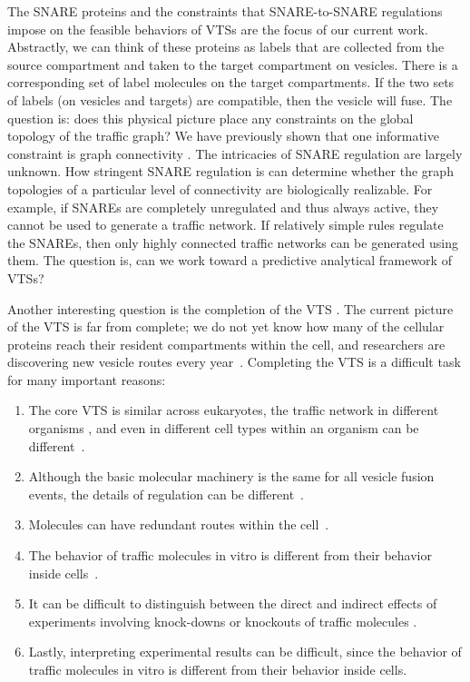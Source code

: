 The SNARE proteins and the constraints that SNARE-to-SNARE regulations
impose on the feasible behaviors of VTSs are the focus of
our current work.
%
Abstractly, we can think of these proteins as labels that are
collected from the source compartment and taken to the target
compartment on vesicles.
%
There is a corresponding set of label molecules on the target compartments.
%
If the two sets of labels (on vesicles and targets) are compatible,
then the vesicle will fuse.
%
The question is: does this physical picture place any constraints on
the global topology of the traffic graph? We have previously shown that one informative constraint is graph connectivity \cite{shukla2017discovering}.
%
The intricacies of SNARE regulation are largely unknown.
%
How stringent SNARE regulation is can determine whether the graph
topologies of a particular level of connectivity are biologically
realizable.
%
For example, if SNAREs are completely unregulated and thus always
active, they cannot be used to generate a traffic network.
%
If relatively simple rules regulate the SNAREs, then only
highly connected traffic networks can be generated using them.
%
The question is, can we work toward a predictive analytical framework
of VTSs?

Another interesting question is the completion of the VTS \cite{synthesisGupta}. 
%
The current picture of the VTS is far from complete; we do not yet know how many of the cellular proteins reach their resident compartments within the cell, and
researchers are discovering new vesicle routes every
year~\cite{nickel2018unconventional,weill2018toolbox}. 
%
Completing the VTS is a difficult task for many important reasons: 
\begin{enumerate}
	\item The core VTS is similar across eukaryotes, the traffic network in different organisms \cite{richardson2015evolutionary, barlow2017seeing}, and even in different cell types within an organism can be different~\cite{stoops2014trafficking,zhou2015arp2}.
	\item Although the basic molecular machinery is the same for all vesicle fusion events, the details of regulation can be different~\cite{davletov2007regulation,di2010calcium}.
	\item Molecules can have redundant routes within the cell~\cite{shimizu2014compensatory,nakatsukasa2014nutrient}.
	\item The behavior of traffic molecules in vitro is different from their behavior inside cells~\cite{furukawa2014multiple}. 
	\item It can be difficult to distinguish between the direct and indirect effects of experiments involving knock-downs or knockouts of traffic molecules \cite{hirst2004epsinr,mishev2013small}.
    \item Lastly, interpreting experimental results can be difficult, since the behavior of traffic molecules in vitro is different from their behavior inside cells.
\end{enumerate}

